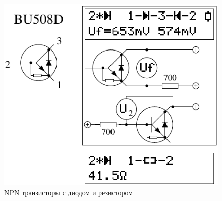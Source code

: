 \begin{figure}[H]
\centering
\includegraphics[width=.8\textwidth]{../FIG/BJT_BU508D.pdf}
\caption{NPN транзисторы с диодом и резистором}
\label{fig:BJT-NPN-Di-R}
\end{figure}

